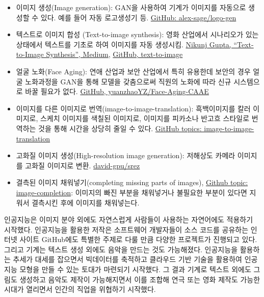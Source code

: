 \documentclass[smallextended]{svjour3}       %
\begin{document}
\begin{itemize}
\item
  이미지 생성(Image generation): GAN을 사용하여 기계가 이미지를 자동으로
  생성할 수 있다. 예를 들어 자동 로고생성기 등.
  \href{https://github.com/alex-sage/logo-gen}{GitHub:
  alex-sage/logo-gen}
\item
  텍스트로 이미지 합성 (Text-to-image synthesis): 영화 산업에서
  시나리오가 있는 상태에서 텍스트를 기초로 하여 이미지를 자동 생성시킴.
  \href{https://medium.com/datadriveninvestor/text-to-image-synthesis-6e5de1bf86ec}{Nikunj
  Gupta, ``Text-to-Image Synthesis'', Medium},
  \href{https://github.com/crisbodnar/text-to-image}{GitHub,
  text-to-image}
\item
  얼굴 노화(Face Aging): 연애 산업과 보안 산업에서 특히 유용한데 보안의
  경우 얼굴 노화과정을 GAN을 통해 모델을 갖춤으로써 직원의 노화에 따라
  신규 시스템으로 바꿀 필요가 없다.
  \href{https://github.com/yuanzhaoYZ/Face-Aging-CAAE}{GitHub,
  yuanzhaoYZ/Face-Aging-CAAE}
\item
  이미지를 다른 이미지로 번역(image-to-image-translation): 흑백이미지를
  칼러 이미지로, 스케치 이미지를 색칠된 이미지로, 이미지를 피카소나
  반고흐 스타일로 번역하는 것을 통해 시간을 상당히 줄일 수 있다.
  \href{https://github.com/topics/image-to-image-translation}{GitHub
  topics: image-to-image-translation}
\item
  고화질 이미지 생성(High-resolution image generation): 저해상도 카메라
  이미지를 고화질 이미지로 변환.
  \href{https://github.com/david-gpu/srez}{david-gpu/srez}
\item
  결측된 이미지 채워넣기(completing missing parts of images),
  \href{https://github.com/topics/image-completion}{Github topic:
  image-completion}: 이미지의 빠진 부분을 채워넣거나 불필요한 부분이
  있다면 지워서 결측시킨 후에 이미지를 채워넣는다.
\end{itemize}

인공지능은 이미지 분야 외에도 자연스럽게 사람들이 사용하는 자연어에도
적용하기 시작했다. 인공지능을 활용한 저작은 소프트웨어 개발자들이 소스
코드를 공유하는 인터넷 사이트 GitHub에도 특별한 주제로 다룰 만큼 다양한
프로젝트가 진행되고 있다. 그리고 기계는 텍스트 생성 외에도 음악을 만드는
것도 가능해졌다. 인공지능을 활용하는 추세가 대세를 잡으면서 빅데이터를
축적하고 클라우드 기반 기술을 활용하여 인공지능 모형을 만들 수 있는
토대가 마련되기 시작했다. 그 결과 기계로 텍스트 외에도 그림도 생성하고
음악도 제작이 가능해지면서 이를 조합해 연극 또는 영화 제작도 가능한
시대가 열리면서 인간의 직업을 위협하기 시작했다.
\end{document}
